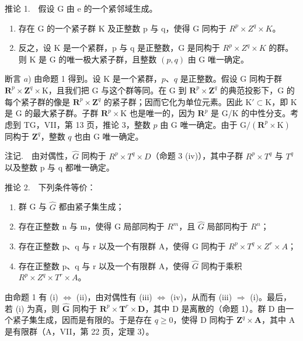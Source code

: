 推论 1.　假设 G 由 e 的一个紧邻域生成。

\begin{enumerate}
\def\labelenumi{\alph{enumi})}
\item
  存在 G 的一个紧子群 K 及正整数 p 与 q，使得 G 同构于 \(R^{p} \times Z^{q} \times K\)。
\item
  反之，设 K 是一个紧群，p 与 q 是正整数，G 是同构于 \(R^{p} \times Z^{q} \times K\) 的群。则 K 是 G 的唯一极大紧子群，且整数 \((p,q)\) 由 G 唯一确定。
\end{enumerate}

断言 \(a\)) 由命题 1 得到。设 K 是一个紧群，\(p\)、\(q\) 是正整数。假设 G 同构于群 \(\mathbf{R}^{p} \times \mathbf{Z}^{q} \times \mathrm{K}\)，且我们把 G 与这个群等同。在 G 到 \(\mathbf{R}^{p} \times \mathbf{Z}^{q}\) 的典范投影下，G 的每个紧子群的像是 \(\mathbf{R}^{p} \times \mathbf{Z}^{q}\) 的紧子群；因而它化为单位元素。因此 \(\mathrm{K}' \subset \mathrm{K}\)，即 K 是 G 的最大紧子群。子群 \(\mathbf{R}^{p} \times \mathrm{K}\) 也是唯一的，因为 \(\mathbf{R}^{p}\) 是 G/K 的中性分支。考虑到 TG，VII，第 13 页，推论 3，整数 \(p\) 由 G 唯一确定。由于 \(\mathrm{G}/(\mathbf{R}^{p} \times \mathrm{K})\) 同构于 \(\mathbf{Z}^{q}\)，整数 \(q\) 也由 G 唯一确定。

注记.　由对偶性，\(\hat{G}\) 同构于 \(R^{p} \times T^{q} \times D\)（命题 3 (iv)），其中子群 \(R^{p} \times T^{q}\) 与 \(T^{q}\) 以及整数 p 与 q 都唯一确定。

推论 2.　下列条件等价：

\begin{enumerate}
\def\labelenumi{(\roman{enumi})}
\item
  群 G 与 \(\hat{G}\) 都由紧子集生成；
\item
  存在正整数 n 与 m，使得 G 局部同构于 \(R^{m}\)，且 \(\hat{G}\) 局部同构于 \(R^{n}\)；
\item
  存在正整数 p、q 与 r 以及一个有限群 A，使得 G 同构于 \(R^{p} \times T^{q} \times Z^{r} \times A\)；
\item
  存在正整数 p、q 与 r 以及一个有限群 A，使得 \(\hat{G}\) 同构于乘积 \(R^{p} \times Z^{q} \times T^{r} \times A\)。
\end{enumerate}

由命题 1 有 (i) \(\Leftrightarrow\) (ii)，由对偶性有 (iii) \(\Leftrightarrow\) (iv)，从而有 (iii) \(\Rightarrow\) (i)。最后，若 (i) 为真，则 \(\widehat{\mathbf{G}}\) 同构于 \(\mathbf{R}^{p} \times \mathbf{T}^{r} \times \mathbf{D}\)，其中 D 是离散的（命题 1）。群 D 由一个紧子集生成，因而是有限的。于是存在 \(q \geqslant 0\)，使得 D 同构于 \(\mathbf{Z}^{q} \times \mathbf{A}\)，其中 A 是有限群（A，VII，第 22 页，定理 3）。

